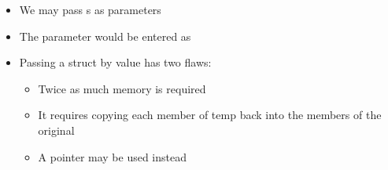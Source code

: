 \begin{itemize}
\begin{itemize}
\begin{itemize}
\begin{itemize}
            \end{itemize}

        \end{itemize}

      \item We may pass s as parameters

      \item The parameter would be entered as  

      \item Passing a struct by value has two flaws:

        \begin{itemize}

          \item Twice as much memory is required

          \item It requires copying each member of temp back into the members of the original 

          \item A pointer may be used instead

        \end{itemize}

    \end{itemize}

\end{itemize}



